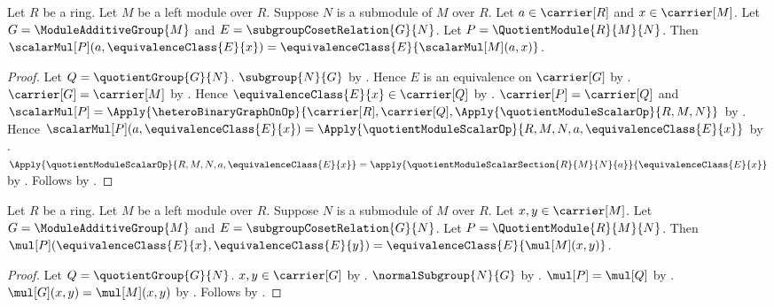 \begin{proposition}\label{quotient_module_scalar_apply}
    Let $R$ be a ring.
    Let $M$ be a left module over $R$.
    Suppose $N$ is a submodule of $M$ over $R$.
    Let $a\in\carrier[R]$ and $x\in\carrier[M]$.
    Let $G=\ModuleAdditiveGroup{M}$ and
        $E=\subgroupCosetRelation{G}{N}$.
    Let $P=\QuotientModule{R}{M}{N}$.
    Then
        $\scalarMul[P](a,\equivalenceClass{E}{x})
            =\equivalenceClass{E}{\scalarMul[M](a,x)}$.
\end{proposition}
\begin{proof}
    Let $Q=\quotientGroup{G}{N}$.
    $\subgroup{N}{G}$ by .
    Hence $E$ is an equivalence on $\carrier[G]$ by
        .
    $\carrier[G]=\carrier[M]$ by
        .
    Hence $\equivalenceClass{E}{x}\in\carrier[Q]$ by
        .
    $\carrier[P]=\carrier[Q]$ and
        $\scalarMul[P]=\Apply{\heteroBinaryGraphOnOp}{
            \carrier[R],\carrier[Q],
            \Apply{\quotientModuleScalarOp}{R,M,N}}$ by
        .
    Hence
        $\scalarMul[P](a,\equivalenceClass{E}{x})
            =\Apply{\quotientModuleScalarOp}{
                R,M,N,a,\equivalenceClass{E}{x}}$ by
        .
    $\Apply{\quotientModuleScalarOp}{
        R,M,N,a,\equivalenceClass{E}{x}}
        =\apply{\quotientModuleScalarSection{R}{M}{N}{a}}{
            \equivalenceClass{E}{x}}$ by
        .
    Follows by .
\end{proof}

\begin{proposition}\label{quotient_module_add_apply}
    Let $R$ be a ring.
    Let $M$ be a left module over $R$.
    Suppose $N$ is a submodule of $M$ over $R$.
    Let $x,y\in\carrier[M]$.
    Let $G=\ModuleAdditiveGroup{M}$ and
        $E=\subgroupCosetRelation{G}{N}$.
    Let $P=\QuotientModule{R}{M}{N}$.
    Then
        $\mul[P](\equivalenceClass{E}{x},
            \equivalenceClass{E}{y})
        =\equivalenceClass{E}{\mul[M](x,y)}$.
\end{proposition}
\begin{proof}
    Let $Q=\quotientGroup{G}{N}$.
    $x,y\in\carrier[G]$ by .
    $\normalSubgroup{N}{G}$ by
        .
    $\mul[P]=\mul[Q]$ by
        .
    $\mul[G](x,y)=\mul[M](x,y)$ by
        .
    Follows by .
\end{proof}

